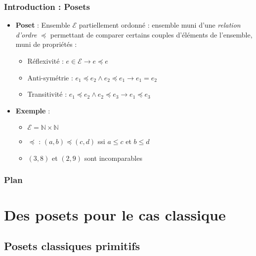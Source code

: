 \documentclass{beamer}
\begin{document}
\begin{frame}
    \frametitle{Introduction : Posets}
    \begin{itemize}
        \item \textbf{Poset} : Ensemble $\mathcal{E}$ partiellement ordonné
        : ensemble muni d'une \emph{relation d'ordre} $\preccurlyeq$
        permettant de comparer certains couples d'éléments de l'ensemble,
        muni de propriétés :
        \begin{itemize}
            \item Réflexivité : $e \in \mathcal{E} \to e \preccurlyeq e$
            \item Anti-symétrie : $e_1 \preccurlyeq e_2 \wedge e_2
                \preccurlyeq e_1 \to e_1 = e_2$
            \item Transitivité : $e_1 \preccurlyeq e_2 \wedge e_2
                \preccurlyeq e_3 \to e_1 \preccurlyeq e_3$
        \end{itemize}
        \item \textbf{Exemple} :
            \begin{itemize}
                \item $\mathcal{E} = \mathbb{N} \times \mathbb{N}$
                \item $\preccurlyeq$ : $(a,b) \preccurlyeq (c, d)$ ssi
                    $a \leqslant c$ et $b \leqslant d$
                \item $(3,8)$ et $(2,9)$ sont incomparables
            \end{itemize}
    \end{itemize}
\end{frame}

\begin{frame}
    \frametitle{Plan}
    \tableofcontents
\end{frame}

\section{Des posets pour le cas classique}

\subsection{Posets classiques primitifs}
\end{document}
